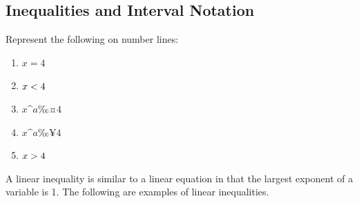             \subsection{Inequalities and Interval Notation}
            \nopagebreak
      \label{m39254*id157128}Represent the following
on number lines:\par 
      \label{m39254*id157134}\begin{enumerate}[noitemsep, label=\textbf{\arabic*}. ] 
            \label{m39254*uid77}\item 
          $x=4$
        \label{m39254*uid78}\item 
          $x<{}4$
        \label{m39254*uid79}\item 
          $x\^{a}‰¤4$
        \label{m39254*uid80}\item 
          $x\^{a}‰¥4$
        \label{m39254*uid81}\item 
          $x>{}4$
        \end{enumerate}
      \label{m39254*id157267}A linear inequality is similar to a linear equation in that the largest exponent of a variable is 1. The following are examples of linear inequalities.\par 
      \label{m39254*id157271}\nopagebreak\noindent{}
        
